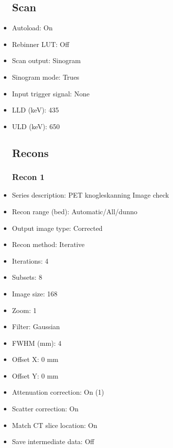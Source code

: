 \documentclass[12pt]{article}
\begin{document}
\begin{itemize}
\subsection{Scan}
\item Autoload: On
\item Rebinner LUT: Off
\item Scan output: Sinogram
\item Sinogram mode: Trues
\item Input trigger signal: None
\item LLD (keV): 435
\item ULD (keV): 650
\subsection{Recons}
\subsubsection{Recon 1}
\item Series description: PET  knogleskanning  Image check
\item Recon range (bed): Automatic/All/dunno
\item Output image type: Corrected
\item Recon method: Iterative
\item Iterations: 4
\item Subsets: 8
\item Image size: 168
\item Zoom: 1
\item Filter: Gaussian
\item FWHM (mm): 4
\item Offset X: 0 mm
\item Offset Y: 0 mm
\item Attenuation correction: On (1)
\item Scatter correction: On
\item Match CT slice location: On
\item Save intermediate data: Off

\end{itemize}
\end{document}
